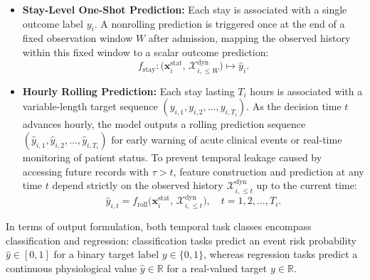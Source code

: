 \begin{itemize}
\item \textbf{Stay-Level One-Shot Prediction:} Each stay is associated with a single outcome label $y_i$. A nonrolling prediction is triggered once at the end of a fixed observation window $W$ after admission, mapping the observed history within this fixed window to a scalar outcome prediction:
\begin{equation*}
f_{\text{stay}} : \big(\mathbf{x}_i^{\text{stat}},\, \mathcal{X}_{i, \le W}^{\text{dyn}}\big) \longmapsto \hat{y}_i.
\end{equation*}
\item \textbf{Hourly Rolling Prediction:} Each stay lasting $T_i$ hours is associated with a variable-length target sequence $(y_{i,1}, y_{i,2}, \dots, y_{i, T_i})$. As the decision time $t$ advances hourly, the model outputs a rolling prediction sequence $(\hat{y}_{i,1}, \hat{y}_{i,2}, \dots, \hat{y}_{i, T_i})$ for early warning of acute clinical events or real-time monitoring of patient status. To prevent temporal leakage caused by accessing future records with $\tau > t$, feature construction and prediction at any time $t$ depend strictly on the observed history $\mathcal{X}_{i, \le t}^{\text{dyn}}$ up to the current time:
\begin{equation*}
\hat{y}_{i,t} = f_{\text{roll}}\big(\mathbf{x}_i^{\text{stat}},\, \mathcal{X}_{i, \le t}^{\text{dyn}}\big), \quad t = 1, 2, \dots, T_i.
\end{equation*}
\end{itemize}

In terms of output formulation, both temporal task classes encompass classification and regression: classification tasks predict an event risk probability $\hat{y} \in [0, 1]$ for a binary target label $y \in \{0, 1\}$, whereas regression tasks predict a continuous physiological value $\hat{y} \in \mathbb{R}$ for a real-valued target $y \in \mathbb{R}$.

